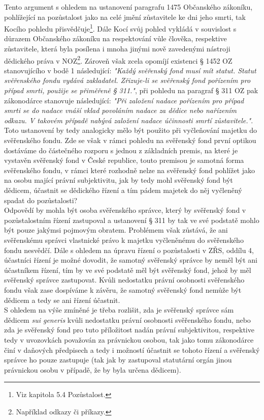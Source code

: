 \documentclass{article}
\begin{document}
 Tento argument s ohledem na ustanovení paragrafu 1475 Občanského zákoníku, pohlížející na pozůstalost jako na celé jmění zůstavitele ke dni jeho smrti, tak Kocího pohledu přisvědčuje\footnote{Viz kapitola 5.4 Pozůstalost.}. Dále Kocí svůj pohled vykládá v souvislost s důrazem Občanského zákoníku na respektování vůle člověka, respektive zůstavitele, která byla posílena i mnoha jinými nově zavedenými nástroji dědického práva v NOZ\footnote{Například odkazy či příkazy.}. Zároveň však zcela opomíjí existenci § 1452 OZ stanovujícího v bodě 1 následující: \textit{"Každý svěřenský fond musí mít statut. Statut svěřenského fondu vydává zakladatel. Zřizuje-li se svěřenský fond pořízením pro případ smrti, použije se přiměřeně § 311."}, při pohledu na paragraf § 311 OZ pak zákonodárce stanovuje následující: \textit{"Při založení nadace pořízením pro případ smrti se do nadace vnáší vklad povoláním nadace za dědice nebo nařízením odkazu. V takovém případě nabývá založení nadace účinnosti smrtí zůstavitele."}. Toto ustanovení by tedy analogicky mělo být použito při vyčleňování majetku do svěřenského fondu. Zde se však v rámci pohledu na svěřenský fond první optikou dostáváme do částečného rozporu s jednou z základních premis, na které je vystavěn svěřenský fond v České republice, touto premisou je samotná forma svěřenského fondu, v rámci které rozhodně nelze na svěřenský fond pohlížet jako na osobu mající právní subjektivitu, jak by tedy mohl svěřenský fond být dědicem, účastnit se dědického řízení a tím pádem majetek do něj vyčleněný spadat do pozůstalosti? \\
 
 Odpovědí by mohla být osoba svěřenského správce, který by svěřenský fond v pozůstalostním řízení zastupoval a ustanovení § 311 by tak ve své podstatě mohlo být pouze jakýmsi pojmovým obratem. Problémem však zůstává, že ani svěřenskému správci vlastnické právo k majetku vyčleněnému do svěřenského fondu nesvědčí. Dále s ohledem na úpravu řízení o pozůstalosti v ZŘS, oddílu 4, účastníci řízení je možné dovodit, že samotný svěřenský správce by neměl být ani účastníkem řízení, tím by ve své podstatě měl být svěřenský fond, jehož by měl svěřenský správce zastupovat. Kvůli nedostatku právní osobnosti svěřenského fondu však zase dospíváme k závěru, že samotný svěřenský fond nemůže být dědicem a tedy se ani řízení účastnit.\\
 
 S ohledem na výše zmíněné je třeba rozlišit, zda je svěřenský správce sám dědicem \textit{sui generis} kvůli nedostatku právní osobnosti svěřenského fondu, nebo zda je svěřenský fond pro tuto příložitost nadán právní subjektivitou, respektive tedy v uvozovkách považován za právnickou osobou, tak jako tomu zákonodárce činí  v daňových předpisech a tedy i možností účastnit se tohoto řízení a svěřenský správce ho pouze zastupuje (tak jak by zastupoval statutární orgán jinou právnickou osobu v případě, že by byla určena dědicem).\\
 
\end{document}
